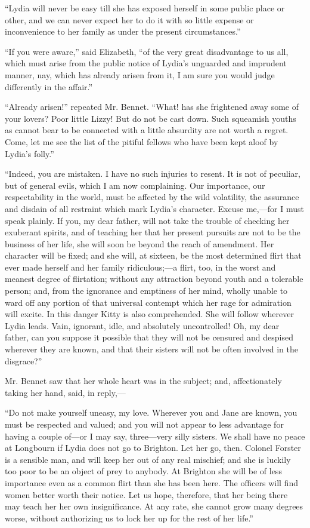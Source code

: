 ``Lydia will never be easy till she has exposed herself in some public place or other, and we can never expect her to do it with so little expense or inconvenience to her family as under the present circumstances.''

``If you were aware,'' said Elizabeth, ``of the very great disadvantage to us all, which must arise from the public notice of Lydia's unguarded and imprudent manner, nay, which has already arisen from it, I am sure you would judge differently in the affair.''

``Already arisen!'' repeated Mr. Bennet. ``What! has she frightened away some of your lovers? Poor little Lizzy! But do not be cast down. Such squeamish youths as cannot bear to be connected with a little absurdity are not worth a regret. Come, let me see the list of the pitiful fellows who have been kept aloof by Lydia's folly.''

``Indeed, you are mistaken. I have no such injuries to resent. It is not of peculiar, but of general evils, which I am now complaining. Our importance, our respectability in the world, must be affected by the wild volatility, the assurance and disdain of all restraint which mark Lydia's character. Excuse me,---for I must speak plainly. If you, my dear father, will not take the trouble of checking her exuberant spirits, and of teaching her that her present pursuits are not to be the business of her life, she will soon be beyond the reach of amendment. Her character will be fixed; and she will, at sixteen, be the most determined flirt that ever made herself and her family ridiculous;---a flirt, too, in the worst and meanest degree of flirtation; without any attraction beyond youth and a tolerable person; and, from the ignorance and emptiness of her mind, wholly unable to ward off any portion of that universal contempt which her rage for admiration will excite. In this danger Kitty is also comprehended. She will follow wherever Lydia leads. Vain, ignorant, idle, and absolutely uncontrolled! Oh, my dear father, can you suppose it possible that they will not be censured and despised wherever they are known, and that their sisters will not be often involved in the disgrace?''

Mr. Bennet saw that her whole heart was in the subject; and, affectionately taking her hand, said, in reply,---

``Do not make yourself uneasy, my love. Wherever you and Jane are known, you must be respected and valued; and you will not appear to less advantage for having a couple of---or I may say, three---very silly sisters. We shall have no peace at Longbourn if Lydia does not go to Brighton. Let her go, then. Colonel Forster is a sensible man, and will keep her out of any real mischief; and she is luckily too poor to be an object of prey to anybody. At Brighton she will be of less importance even as a common flirt than she has been here. The officers will find women better worth their notice. Let us hope, therefore, that her being there may teach her her own insignificance. At any rate, she cannot grow many degrees worse, without authorizing us to lock her up for the rest of her life.''


